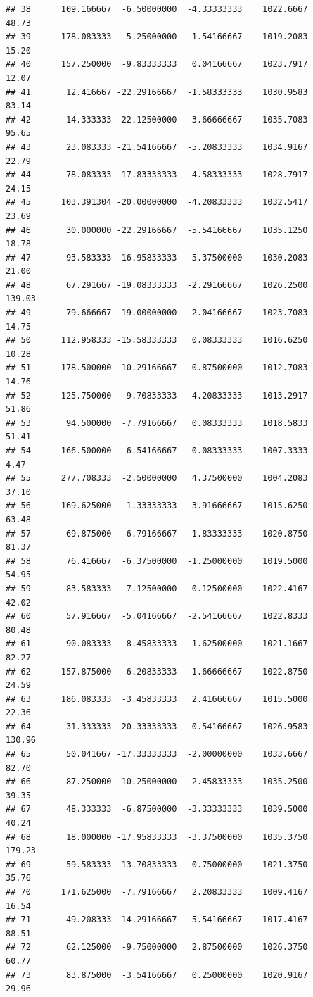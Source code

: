 \documentclass[
]{article}
\begin{document}
\begin{verbatim}
## 38      109.166667  -6.50000000  -4.33333333    1022.6667       48.73
## 39      178.083333  -5.25000000  -1.54166667    1019.2083       15.20
## 40      157.250000  -9.83333333   0.04166667    1023.7917       12.07
## 41       12.416667 -22.29166667  -1.58333333    1030.9583       83.14
## 42       14.333333 -22.12500000  -3.66666667    1035.7083       95.65
## 43       23.083333 -21.54166667  -5.20833333    1034.9167       22.79
## 44       78.083333 -17.83333333  -4.58333333    1028.7917       24.15
## 45      103.391304 -20.00000000  -4.20833333    1032.5417       23.69
## 46       30.000000 -22.29166667  -5.54166667    1035.1250       18.78
## 47       93.583333 -16.95833333  -5.37500000    1030.2083       21.00
## 48       67.291667 -19.08333333  -2.29166667    1026.2500      139.03
## 49       79.666667 -19.00000000  -2.04166667    1023.7083       14.75
## 50      112.958333 -15.58333333   0.08333333    1016.6250       10.28
## 51      178.500000 -10.29166667   0.87500000    1012.7083       14.76
## 52      125.750000  -9.70833333   4.20833333    1013.2917       51.86
## 53       94.500000  -7.79166667   0.08333333    1018.5833       51.41
## 54      166.500000  -6.54166667   0.08333333    1007.3333        4.47
## 55      277.708333  -2.50000000   4.37500000    1004.2083       37.10
## 56      169.625000  -1.33333333   3.91666667    1015.6250       63.48
## 57       69.875000  -6.79166667   1.83333333    1020.8750       81.37
## 58       76.416667  -6.37500000  -1.25000000    1019.5000       54.95
## 59       83.583333  -7.12500000  -0.12500000    1022.4167       42.02
## 60       57.916667  -5.04166667  -2.54166667    1022.8333       80.48
## 61       90.083333  -8.45833333   1.62500000    1021.1667       82.27
## 62      157.875000  -6.20833333   1.66666667    1022.8750       24.59
## 63      186.083333  -3.45833333   2.41666667    1015.5000       22.36
## 64       31.333333 -20.33333333   0.54166667    1026.9583      130.96
## 65       50.041667 -17.33333333  -2.00000000    1033.6667       82.70
## 66       87.250000 -10.25000000  -2.45833333    1035.2500       39.35
## 67       48.333333  -6.87500000  -3.33333333    1039.5000       40.24
## 68       18.000000 -17.95833333  -3.37500000    1035.3750      179.23
## 69       59.583333 -13.70833333   0.75000000    1021.3750       35.76
## 70      171.625000  -7.79166667   2.20833333    1009.4167       16.54
## 71       49.208333 -14.29166667   5.54166667    1017.4167       88.51
## 72       62.125000  -9.75000000   2.87500000    1026.3750       60.77
## 73       83.875000  -3.54166667   0.25000000    1020.9167       29.96

\end{verbatim}
\end{document}
